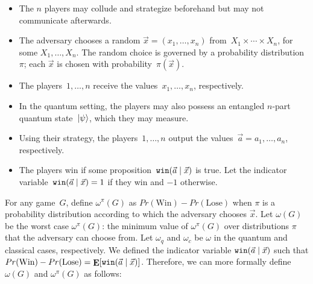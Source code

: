 







\begin{itemize}
\item{The $n$ players may collude and strategize beforehand but may not communicate afterwards.}
\item{The adversary chooses a random $\vec{x}=(x_1, \ldots, x_n)$ from~$X_1 \times \cdots \times X_n$, for some $X_1, \ldots, X_n$. The random choice is governed by a probability distribution~$\pi$; each $\vec{x}$ is chosen with probability~$\pi(\vec{x})$.}
\item{The players~$1, \ldots, n$ receive the values~$x_1, \ldots, x_n$, respectively.}
\item{In the quantum setting, the players may also possess an entangled $n$-part quantum state~$\ket{\psi}$, which they may measure.}
\item{Using their strategy, the players~$1, \ldots, n$ output the values~$\vec{a} = a_1, \ldots, a_n$, respectively.}
\item{The players win if some proposition~$\texttt{win}(\vec{a} \nobreak\mid\nobreak \vec{x})$ is true. Let the indicator variable~$\texttt{win}(\vec{a} \nobreak\mid\nobreak \vec{x}) = 1$ if they win and $-1$ otherwise.}
\end{itemize}

For any game~$G$, define $\omega^\pi(G)$ as $Pr(\textrm{Win}) - Pr(\textrm{Lose})$ when $\pi$ is a probability distribution according to which the adversary chooses $\vec{x}$. Let $\omega(G)$ be the worst case $\omega^\pi(G)$: the minimum value of $\omega^\pi(G)$ over distributions $\pi$ that the adversary can choose from. Let $\omega_q$ and $\omega_c$ be $\omega$ in the quantum and classical cases, respectively. We defined the indicator variable $\texttt{win}(\vec{a}\nobreak\mid\nobreak\vec{x})$ such that $Pr(\textrm{Win}) - Pr(\textrm{Lose}) = \mathop{\mathbf{E}}[ \texttt{win}(\vec{a}\nobreak\mid\nobreak\vec{x}) ]$. Therefore, we can more formally define $\omega(G)$ and $\omega^\pi(G)$ as follows:


